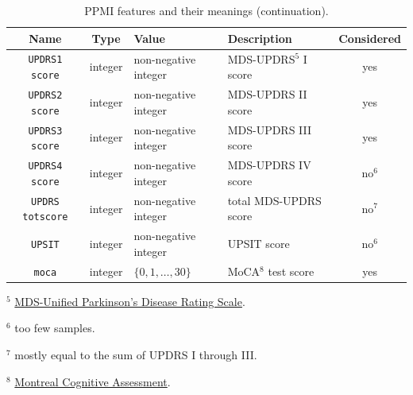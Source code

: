 \clearpage
\begin{table}[!ht]
    \centering 
    \begin{threeparttable}
    \caption{PPMI features and their meanings (continuation).}
    \begin{tabular}{c | c p{3cm} p{4cm} c}
        \toprule
        Name & Type & Value & Description & Considered \\ 
        \midrule
        \texttt{UPDRS1 score} 
            & integer & non-negative integer & MDS-UPDRS$^5$ I score & yes \\ 
        \texttt{UPDRS2 score} 
            & integer & non-negative integer & MDS-UPDRS II score & yes \\ 
        \texttt{UPDRS3 score} 
            & integer & non-negative integer & MDS-UPDRS III score & yes \\ 
        \texttt{UPDRS4 score} 
            & integer & non-negative integer & MDS-UPDRS IV score & no$^6$ \\ 
        \texttt{UPDRS totscore} 
            & integer & non-negative integer & total MDS-UPDRS score & no$^7$ \\ 
        \texttt{UPSIT} 
            & integer & non-negative integer & UPSIT score & no$^6$ \\ 
        \texttt{moca} 
            & integer & $\{0, 1, \dots, 30\}$ & MoCA$^8$ test score & yes \\ 
        \bottomrule 
    \end{tabular}
    \begin{tablenotes}
        \item $^5$ \href{https://www.movementdisorders.org/MDS/MDS-Rating-Scales/MDS-Unified-Parkinsons-Disease-Rating-Scale-MDS-UPDRS.htm}
        {MDS-Unified Parkinson's Disease Rating Scale}.
        \item $^6$ too few samples.
        \item $^7$ mostly equal to the sum of UPDRS I through III.
        \item $^8$ \href{https://mocacognition.com/}{Montreal Cognitive Assessment}.
    \end{tablenotes}
    \end{threeparttable}
\end{table}
